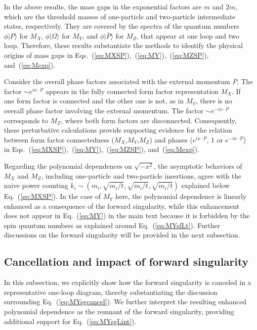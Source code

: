 \documentclass[a4paper,11pt]{article}
\begin{document}
In the above results, the mass gaps in the exponential factors are $m$ and $2m$, which are the threshold masses of one-particle and two-particle intermediate states, respectively. They are covered by the spectra of the quantum numbers $\phi |P\rangle$ for {\color{red}$M_{X}$}, $\phi |\Omega\rangle$ for {\color{blue}$M_{Y}$}, and $\phi |\bar{P} \rangle$ for {\color{orange}$M_{Z}$}, that appear at one loop and two loop. Therefore, these results substantiate the methods to identify the physical origins of mass gaps in Eqs.~(\ref{eq:MXSP}),~(\ref{eq:MY}),~(\ref{eq:MZSP}), and~(\ref{eq:Mexp}). 

Consider the overall phase factors associated with the external momentum $P$. The factor {\color{red}$\sim e^{i x \cdot P}$} appears in the fully connected form factor representation {\color{red}$M_{X}$}. If one form factor is connected and the other one is not, as in {\color{blue}$M_{Y}$}, there is no overall phase factor involving the external momentum. The factor {\color{orange}$\sim e^{-i x \cdot P}$} corresponds to {\color{orange}$M_{Z}$}, where both form factors are disconnected. Consequently, these perturbative calculations provide supporting evidence for the relation between form factor connectedness ({\color{red}$M_{X}$},{\color{blue}$M_{Y}$},{\color{orange}$M_{Z}$}) and phases ({\color{red}$e^{i x \cdot P}$}, {\color{blue}$1$} or {\color{orange}$e^{-i x \cdot P}$}) in Eqs.~(\ref{eq:MXSP}),~(\ref{eq:MY}),~(\ref{eq:MZSP}), and~(\ref{eq:Mexp}). 

Regarding the polynomial dependences on $\sqrt{-x^2}$, the asymptotic behaviors of {\color{red}$M_{X}$} and {\color{orange}$M_{Z}$}, including one-particle and two-particle insertions, agree with the naive power counting $k_i\sim \left(m_i,\sqrt{m_i/t},\sqrt{m_i/t},\sqrt{m_i/t}\right)$ explained below Eq.~(\ref{eq:MXSP}). In the case of {\color{blue}$M_{Y}$} here, the polynomial dependence is linearly enhanced as a consequence of the forward singularity, while this enhancement does not appear in Eq.~(\ref{eq:MY}) in the main text because it is forbidden by the spin quantum numbers as explained around Eq.~(\ref{eq:MYsfLt}). Further discussions on the forward singularity will be provided in the next subsection. 


\subsection{Cancellation and impact of forward singularity}\label{sec:phi3FWSG}
In this subsection, we explicitly show how the forward singularity is canceled in a representative one-loop diagram, thereby substantiating the discussion surrounding Eq.~(\ref{eq:MYsgcancel}). We further interpret the resulting enhanced polynomial dependence as the remnant of the forward singularity, providing additional support for Eq.~(\ref{eq:MYsgLint}).
\end{document}
